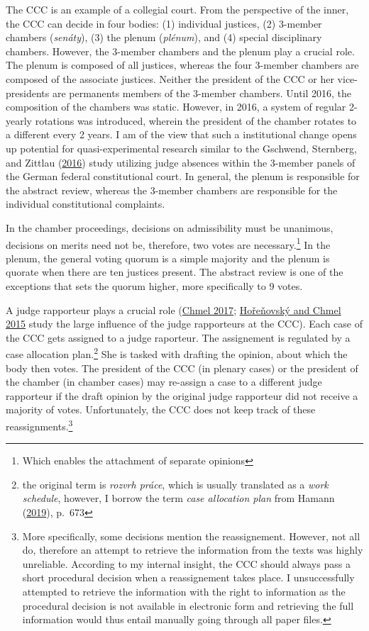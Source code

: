 \documentclass[
  11pt,
]{article}
\begin{document}
The CCC is an example of a collegial court. From the perspective of the
inner, the CCC can decide in four bodies: (1) individual justices, (2)
3-member chambers (\emph{senáty}), (3) the plenum (\emph{plénum}), and
(4) special disciplinary chambers. However, the 3-member chambers and
the plenum play a crucial role. The plenum is composed of all justices,
whereas the four 3-member chambers are composed of the associate
justices. Neither the president of the CCC or her vice-presidents are
permanents members of the 3-member chambers. Until 2016, the composition
of the chambers was static. However, in 2016, a system of regular
2-yearly rotations was introduced, wherein the president of the chamber
rotates to a different every 2 years. I am of the view that such a
institutional change opens up potential for quasi-experimental research
similar to the Gschwend, Sternberg, and Zittlau
(\protect\hyperlink{ref-gschwendAreJudgesPolitical2016}{2016}) study
utilizing judge absences within the 3-member panels of the German
federal constitutional court. In general, the plenum is responsible for
the abstract review, whereas the 3-member chambers are responsible for
the individual constitutional complaints.

In the chamber proceedings, decisions on admissibility must be
unanimous, decisions on merits need not be, therefore, two votes are
necessary.\footnote{Which enables the attachment of separate opinions}
In the plenum, the general voting quorum is a simple majority and the
plenum is quorate when there are ten justices present. The abstract
review is one of the exceptions that sets the quorum higher, more
specifically to 9 votes.

A judge rapporteur plays a crucial role
(\protect\hyperlink{ref-chmelZpravodajoveSenatyVliv2017}{Chmel 2017};
\protect\hyperlink{ref-horenovskyProcessMakingConstitutional2015}{Hořeňovský
and Chmel 2015} study the large influence of the judge rapporteurs at
the CCC). Each case of the CCC gets assigned to a judge raporteur. The
assignement is regulated by a case allocation plan.\footnote{the
  original term is \emph{rozvrh práce}, which is usually translated as a
  \emph{work schedule}, however, I borrow the term \emph{case allocation
  plan} from Hamann
  (\protect\hyperlink{ref-hamannGermanFederalCourts2019}{2019}), p.~673}
She is tasked with drafting the opinion, about which the body then
votes. The president of the CCC (in plenary cases) or the president of
the chamber (in chamber cases) may re-assign a case to a different judge
rapporteur if the draft opinion by the original judge rapporteur did not
receive a majority of votes. Unfortunately, the CCC does not keep track
of these reassignments.\footnote{More specifically, some decisions
  mention the reassignement. However, not all do, therefore an attempt
  to retrieve the information from the texts was highly unreliable.
  According to my internal insight, the CCC should always pass a short
  procedural decision when a reassignement takes place. I unsuccessfully
  attempted to retrieve the information with the right to information as
  the procedural decision is not available in electronic form and
  retrieving the full information would thus entail manually going
  through all paper files.}
\end{document}
